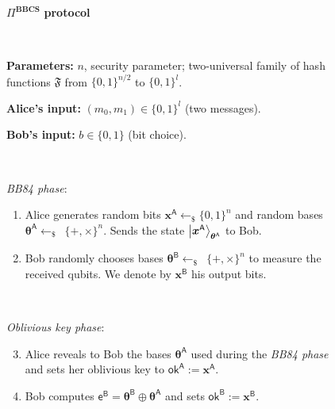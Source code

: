 \begin{figure}[h!]
    \centering
        \begin{tcolorbox}
            
            \centerline{$\Pi^{\textbf{BBCS}}$ \textbf{protocol}}
            
            \
            
            \textbf{Parameters:} $n$, security parameter; two-universal family of hash functions $\mathfrak{F}$ from $\{0,1\}^{n/2}$ to $\{0,1\}^{l}$.
            
            \textbf{Alice's input:} $(m_0, m_1)\in\{0,1\}^l$ (two messages). 
            
            \textbf{Bob's input:} $b\in\{0,1\}$ (bit choice).
            
            \
            
            \textit{BB84 phase}:
            \begin{enumerate}
                \item Alice generates random bits $\bm{x}^{\mathsf{A}}\leftarrow_{\$}\{0,1\}^n$ and random bases $\bm{\theta}^{\mathsf{A}}\leftarrow_{\$}$~$\{+,\times\}^n$. Sends the state $\ket{\bm{x}^{\mathsf{A}}}_{\bm{\theta}^{\mathsf{A}}}$ to Bob.
                \item Bob randomly chooses bases $\bm{\theta}^{\mathsf{B}}\leftarrow_{\$}$~$\{+,\times\}^n$ to measure the received qubits. We denote by $\bm{x}^{\mathsf{B}}$ his output bits.
            \end{enumerate}
            
            \
            
            \textit{Oblivious key phase}:
            \begin{enumerate}
            \setcounter{enumi}{2}
                \item Alice reveals to Bob the bases $\bm{\theta}^{\mathsf{A}}$ used during the \textit{BB84 phase} and sets her oblivious key to $\mathsf{ok}^{\mathsf{A}}:=\bm{x}^{\mathsf{A}}$.
                \item Bob computes $\mathsf{e}^\mathsf{B} = \bm{\theta}^{\mathsf{B}} \oplus \bm{\theta}^{\mathsf{A}}$ and sets $\mathsf{ok}^{\mathsf{B}}:=\bm{x}^{\mathsf{B}}$.
            \end{enumerate}
            
            \
            

\end{tcolorbox}
\end{figure}

